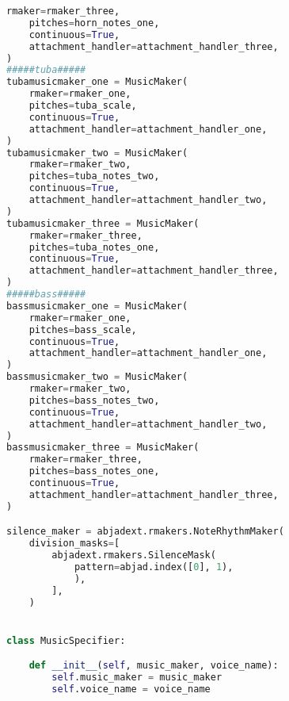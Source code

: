 \begin{lstlisting}[language=Python, caption=Tianshu Segment\_III]
    rmaker=rmaker_three,
    pitches=horn_notes_one,
    continuous=True,
    attachment_handler=attachment_handler_three,
)
#####tuba#####
tubamusicmaker_one = MusicMaker(
    rmaker=rmaker_one,
    pitches=tuba_scale,
    continuous=True,
    attachment_handler=attachment_handler_one,
)
tubamusicmaker_two = MusicMaker(
    rmaker=rmaker_two,
    pitches=tuba_notes_two,
    continuous=True,
    attachment_handler=attachment_handler_two,
)
tubamusicmaker_three = MusicMaker(
    rmaker=rmaker_three,
    pitches=tuba_notes_one,
    continuous=True,
    attachment_handler=attachment_handler_three,
)
#####bass#####
bassmusicmaker_one = MusicMaker(
    rmaker=rmaker_one,
    pitches=bass_scale,
    continuous=True,
    attachment_handler=attachment_handler_one,
)
bassmusicmaker_two = MusicMaker(
    rmaker=rmaker_two,
    pitches=bass_notes_two,
    continuous=True,
    attachment_handler=attachment_handler_two,
)
bassmusicmaker_three = MusicMaker(
    rmaker=rmaker_three,
    pitches=bass_notes_one,
    continuous=True,
    attachment_handler=attachment_handler_three,
)

silence_maker = abjadext.rmakers.NoteRhythmMaker(
    division_masks=[
        abjadext.rmakers.SilenceMask(
            pattern=abjad.index([0], 1),
            ),
        ],
    )


class MusicSpecifier:

    def __init__(self, music_maker, voice_name):
        self.music_maker = music_maker
        self.voice_name = voice_name



\end{lstlisting}
